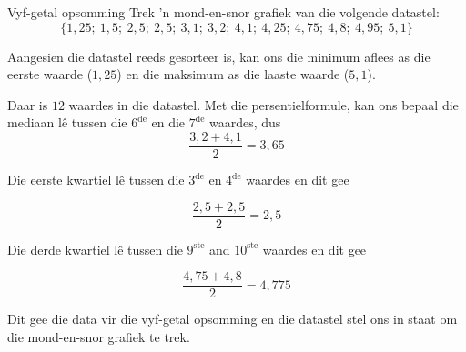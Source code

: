 \begin{wex}{Vyf-getal opsomming}
{Trek ’n mond-en-snor grafiek van die volgende datastel:
    \begin{equation*}
      \{1,25;\ 1,5;\ 2,5;\ 2,5;\ 3,1;\ 3,2;\ 4,1;\ 4,25;\ 4,75;\ 4,8;\ 4,95;\ 5,1\}
    \end{equation*}
}{

  Aangesien die datastel reeds gesorteer is, kan ons die minimum aflees as die eerste waarde ($1,25$) en die maksimum as die laaste waarde ($5,1$).


  Daar is $12$ waardes in die datastel. Met die persentielformule, kan ons bepaal die mediaan lê tussen die $6^{\mathrm{de}}$ en die $7^{\mathrm{de}}$
  waardes, dus
  \begin{equation*}
    \frac{3,2 + 4,1}{2} = 3,65
  \end{equation*}

  Die eerste kwartiel lê tussen die $3^{\mathrm{de}}$ en $4^{\mathrm{de}}$ waardes en dit gee
  
  \begin{equation*}
    \frac{2,5 + 2,5}{2} = 2,5
  \end{equation*}

  Die derde kwartiel lê tussen die $9^{\mathrm{ste}}$ and $10^{\mathrm{ste}}$ waardes en dit gee
  
  \begin{equation*}
    \frac{4,75 + 4,8}{2} = 4,775
  \end{equation*}

 Dit gee die data vir die vyf-getal opsomming en die datastel stel ons in staat om die mond-en-snor grafiek te trek.

  \begin{center}
\end{center}}
\end{wex}
